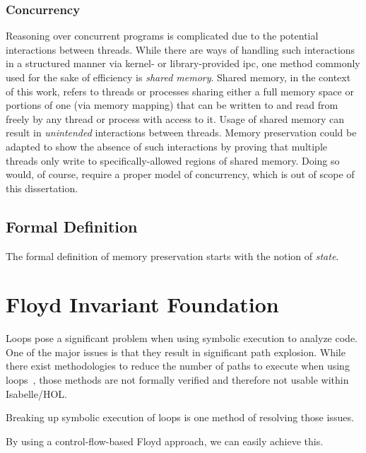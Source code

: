 \subsubsection{Concurrency}
Reasoning over concurrent programs is complicated
due to the potential interactions between threads.
While there are ways of handling such interactions in a structured manner
via kernel- or library-provided \ac{ipc},
one method commonly used for the sake of efficiency is \emph{shared memory}.
Shared memory, in the context of this work,
refers to threads or processes sharing either a full memory space
or portions of one (via memory mapping)
that can be written to and read from freely by any thread or process with access to it.
Usage of shared memory can result in \emph{unintended} interactions between threads.
Memory preservation could be adapted to show the absence of such interactions
by proving that multiple threads only write
to specifically-allowed regions of shared memory.
Doing so would, of course, require a proper model of concurrency,
which is out of scope of this dissertation.

\subsection{Formal Definition}
The formal definition of memory preservation starts with the notion of \emph{state}.

\section{Floyd Invariant Foundation}\label{se:cfg_invariant}

Loops pose a significant problem when using symbolic execution to analyze code.
One of the major issues is that they result in significant path explosion.
While there exist methodologies to reduce the number of paths to execute
when using loops~\citep{saxena2009lese,obdrzalek2011efficient},
those methods are not formally verified and therefore not usable within Isabelle/HOL.

Breaking up symbolic execution of loops is one method of resolving those issues.

By using a control-flow-based Floyd approach, we can easily achieve this.

